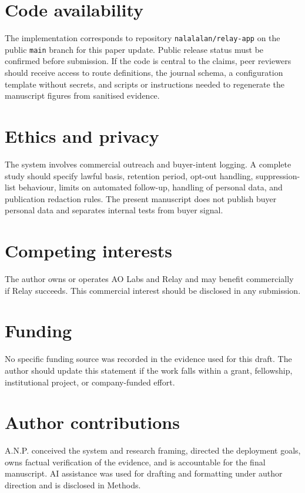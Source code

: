 \documentclass[12pt,letterpaper]{article}
\begin{document}
\section{Code availability}

The implementation corresponds to repository \texttt{nalalalan/relay-app} on the public \texttt{main} branch for this paper update. Public release status must be confirmed before submission. If the code is central to the claims, peer reviewers should receive access to route definitions, the journal schema, a configuration template without secrets, and scripts or instructions needed to regenerate the manuscript figures from sanitised evidence.

\section{Ethics and privacy}

The system involves commercial outreach and buyer-intent logging. A complete study should specify lawful basis, retention period, opt-out handling, suppression-list behaviour, limits on automated follow-up, handling of personal data, and publication redaction rules. The present manuscript does not publish buyer personal data and separates internal tests from buyer signal.

\section{Competing interests}

The author owns or operates AO Labs and Relay and may benefit commercially if Relay succeeds. This commercial interest should be disclosed in any submission.

\section{Funding}

No specific funding source was recorded in the evidence used for this draft. The author should update this statement if the work falls within a grant, fellowship, institutional project, or company-funded effort.

\section{Author contributions}

A.N.P. conceived the system and research framing, directed the deployment goals, owns factual verification of the evidence, and is accountable for the final manuscript. AI assistance was used for drafting and formatting under author direction and is disclosed in Methods.

\printbibliography
\end{document}
